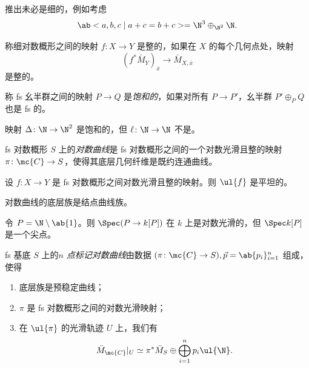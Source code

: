 \begin{exm}
    推出未必是细的，例如考虑
    \[ \ab< a ,b,c \mid a+c=b+c> = \N^3 \oplus_{\N^2} \N. \]
\end{exm}

\begin{defn}
    称细对数概形之间的映射 \(f \colon X \to Y\) 是整的，如果在 \(X\) 的每个几何点处，映射
    \[ (f^*\bar{M}_Y)_{\bar{x}} \to \bar{M}_{X,\bar{x}} \]
    是整的。
\end{defn}

\begin{defn}
    称 fs 幺半群之间的映射 \(P \to Q\) 是\textit{饱和的}，如果对所有 \(P \to P'\)，幺半群 \(P' \oplus_P Q\) 也是 fs 的。
\end{defn}

\begin{exm}
    映射 \(\Delta \colon \N \to \N^2\) 是饱和的，但 \(\ell \colon \N \to \N\) 不是。
\end{exm}

\begin{defn}
    fs 对数概形 \(S\) 上的\textit{对数曲线}是 fs 对数概形之间的一个对数光滑且整的映射 \(\pi \colon \mc{C} \to S\)，使得其底层几何纤维是既约连通曲线。
\end{defn}

\begin{prop}
    设 \(f \colon X \to Y\) 是 fs 对数概形之间对数光滑且整的映射。则 \(\ul{f}\) 是平坦的。
\end{prop}

\begin{thm}
    对数曲线的底层族是结点曲线族。
\end{thm}

\begin{exm}
    令 \(P = \N \setminus \ab\{1\}\)。则 \(\Spec (P \to k[P])\) 在 \(k\) 上是对数光滑的，但 \(\Spec k[P]\) 是一个尖点。
\end{exm}

\begin{defn}
    fs 基底 \(S\) 上的\textit{\(n\) 点标记对数曲线}由数据 \((\pi \colon \mc{C} \to S), \vec{p} = \ab\{p_i\}_{i=1}^n\) 组成，使得
    \begin{enumerate}
        \item 底层族是预稳定曲线；
        \item \(\pi\) 是 fs 对数概形之间的对数光滑映射；
        \item 在 \(\ul{\pi}\) 的光滑轨迹 \(U\) 上，我们有
            \[ \bar{M}_{\mc{C}}|_U \simeq \pi^* \bar{M}_S \oplus \bigoplus_{i=1}^n p_i \ul{\N}. \]
    \end{enumerate}
\end{defn}


